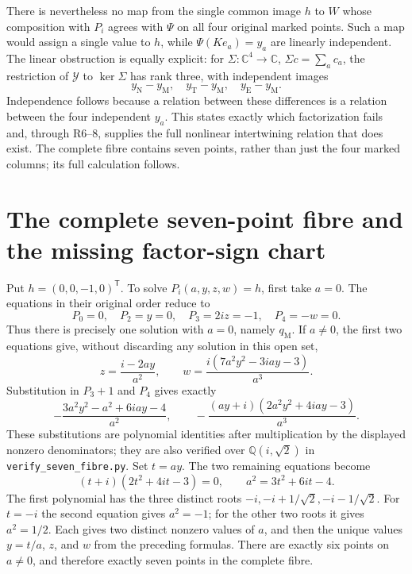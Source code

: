 \documentclass[11pt]{article}
\newcommand{\C}{\mathbb C}
\begin{document}
There is nevertheless no map from the single common image $h$ to
$W$ whose composition with $P_i$ agrees with $\Psi$ on all four
original marked points. Such a map would assign a single value to
$h$, while $\Psi(Ke_a)=y_a$ are linearly independent. The linear
obstruction is equally explicit: for
$\Sigma:\C^4\to\C$, $\Sigma c=\sum_ac_a$, the restriction of
$\mathcal Y$ to $\ker\Sigma$ has rank three, with independent images
\[
 y_{\mathrm N}-y_{\mathrm M},\quad
 y_{\mathrm T}-y_{\mathrm M},\quad
 y_{\mathrm E}-y_{\mathrm M}.
\]
Independence follows because a relation between these differences is
a relation between the four independent $y_a$. This states exactly
which factorization fails and, through R6--8, supplies the full
nonlinear intertwining relation that does exist. The complete fibre
contains seven points, rather than just the four marked columns;
its full calculation follows.

\section{The complete seven-point fibre and the missing factor-sign chart}
Put $h=(0,0,-1,0)^{\mathsf T}$. To solve $P_i(a,y,z,w)=h$, first
take $a=0$. The equations in their original order reduce to
\[
 P_0=0,\quad P_2=y=0,\quad P_3=2iz=-1,\quad P_4=-w=0.
\]
Thus there is precisely one solution with $a=0$, namely $q_{\mathrm M}$.
If $a\ne0$, the first two equations give, without discarding any
solution in this open set,
\[
 z=\frac{i-2ay}{a^2},\qquad
 w=\frac{i(7a^2y^2-3iay-3)}{a^3}.
\]
Substitution in $P_3+1$ and $P_4$ gives exactly
\[
 -\frac{3a^2y^2-a^2+6iay-4}{a^2},\qquad
 -\frac{(ay+i)(2a^2y^2+4iay-3)}{a^3}.
\]
These substitutions are polynomial identities after multiplication by
the displayed nonzero denominators; they are also verified over
$\mathbb Q(i,\sqrt2)$ in \texttt{verify\_seven\_fibre.py}.
Set $t=ay$. The two remaining equations become
\begin{equation}
 (t+i)(2t^2+4it-3)=0,\qquad a^2=3t^2+6it-4.\tag{R9}
\end{equation}
The first polynomial has the three distinct roots
$-i,-i+1/\sqrt2,-i-1/\sqrt2$. For $t=-i$ the second equation
gives $a^2=-1$; for the other two roots it gives $a^2=1/2$.
Each gives two distinct nonzero values of $a$, and then the unique
values $y=t/a$, $z$, and $w$ from the preceding formulas.
There are exactly six points on $a\ne0$, and therefore exactly
seven points in the complete fibre.
\end{document}
